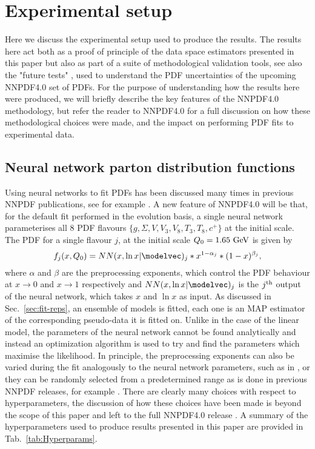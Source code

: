 \section{Experimental setup}

Here we discuss the experimental setup used to produce the results. The results
here act both as a proof of principle of the data space estimators presented in
this paper but also as part of a suite of methodological validation tools, see
also the "future tests" \cite{Cruz_Martinez_2021}, used to understand the PDF
uncertainties of the upcoming NNPDF4.0 set of PDFs. For the purpose of
understanding how the results here were produced, we will briefly describe the
key features of the NNPDF4.0 methodology, but refer the reader to NNPDF4.0 for a
full discussion on how these methodological choices were made, and the impact on
performing PDF fits to experimental data.

\subsection{Neural network parton distribution functions}

Using neural networks to fit PDFs has been discussed many times in previous
NNPDF publications, see for example \cite{nnpdf30, Ball_2017}. A new feature of
NNPDF4.0 will be that, for the default fit performed in the evolution basis, a
single neural network parameterises all 8 PDF flavours $\{ g, \Sigma, V, V_3,
V_8, T_3, T_8, c^+ \}$ at the initial scale. The PDF for a single flavour $j$,
at the initial scale $Q_0 = 1.65~{\rm GeV}$ is given by
\begin{equation}
    f_j(x, Q_0) = NN(x, \ln x | \modelvec)_j * x^{1-\alpha_j} * (1-x)^{\beta_j},
\end{equation}
where $\alpha$ and $\beta$ are the preprocessing exponents, which control the
PDF behaviour at $x \to 0$ and $x \to 1$ respectively and $NN(x, \ln x |
\modelvec)_j$ is the $j^{\rm th}$ output of the neural network, which takes $x$
and $\ln x$ as input. As discussed in Sec.~\ref{sec:fit-reps}, an ensemble of
models is fitted, each one is an MAP estimator of the corresponding pseudo-data
it is fitted on. Unlike in the case of the linear model, the parameters of the
neural network cannot be found analytically and instead an optimization
algorithm is used to try and find the parameters which maximise the likelihood.
In principle, the preprocessing exponents can also be varied during the fit
analogously to the neural network parameters, such as in \cite{Carrazza_2019},
or they can be randomly selected from a predetermined range as is done in
previous NNPDF releases, for example \cite{Ball_2017}. There are clearly many
choices with respect to hyperparameters, the discussion of how these choices
have been made is beyond the scope of this paper and left to the full NNPDF4.0
release \cite{NNPDF40}. A summary of the hyperparameters used to produce results
presented in this paper are provided in Tab.~\ref{tab:Hyperparams}.

